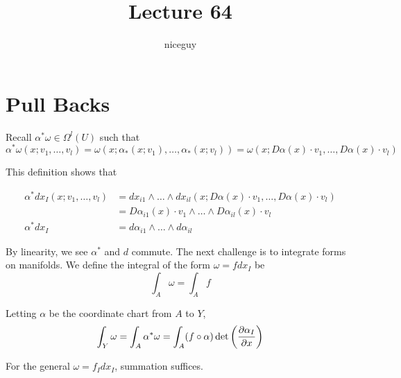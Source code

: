 \documentclass[12pt]{article}
\title{Lecture 64}
\author{niceguy}
\begin{document}
\maketitle

\section{Pull Backs}

Recall $\alpha^*\omega \in \Omega^l(U)$ such that
$$\alpha^*\omega(x;v_1,\dots,v_l) = \omega(x;\alpha_*(x;v_1),\dots,\alpha_*(x;v_l)) = \omega(x;D\alpha(x)\cdot v_1,\dots,D\alpha(x)\cdot v_l)$$

This definition shows that

\begin{align*}
    \alpha^*dx_I(x;v_1,\dots,v_l) &= dx_{i1} \wedge \dots \wedge dx_{il}(x;D\alpha(x)\cdot v_1,\dots,D\alpha(x)\cdot v_l) \\
                                  &= D\alpha_{i1}(x)\cdot v_1 \wedge \dots \wedge D\alpha_{il}(x)\cdot v_l \\
    \alpha^*dx_I &= d\alpha_{i1} \wedge \dots \wedge d\alpha_{il}
\end{align*}

By linearity, we see $\alpha^*$ and $d$ commute. The next challenge is to integrate forms on manifolds. We define the integral of the form $\omega = fdx_I$ be
$$\int_A\omega = \int_A f$$

Letting $\alpha$ be the coordinate chart from $A$ to $Y$,
$$\int_Y \omega = \int_A \alpha^*\omega = \int_A (f\circ\alpha)\det\left(\frac{\partial \alpha_I}{\partial x}\right)$$

For the general $\omega = f_Idx_I$, summation suffices.
\end{document}
